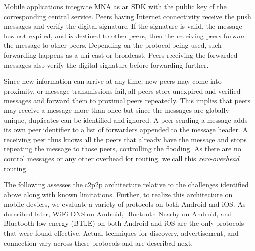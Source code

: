 \documentclass[conference]{IEEEtran}
\begin{document}
Mobile applications integrate MNA as an SDK with the public key of the
corresponding central service. Peers having Internet connectivity
receive the push messages and verify the digital signature.  If the
signature is valid, the message has not expired, and is destined to
other peers, then the receiving peers forward the message to other
peers. Depending on the protocol being used, such forwarding happens
as a uni-cast or broadcast. Peers receiving the forwarded messages
also verify the digital signature before forwarding further.

Since new information can arrive at any time, new peers may come into
proximity, or message transmissions fail, all peers store unexpired
and verified messages and forward them to proximal peers
repeatedly. This implies that peers may receive a message more than
once but since the messages are globally unique, duplicates can be
identified and ignored.  A peer sending a message adds its own peer
identifier to a list of forwarders appended to the message header.  A
receiving peer thus knows all the peers that already have the message
and stops repeating the message to those peers, controlling the
flooding.  As there are no control messages or any other overhead for
routing, we call this \emph{zero-overhead} routing.

The following assesses the c2p2p architecture relative to the
challenges identified above along with known limitations. Further, to
realize this architecture on mobile devices, we evaluate a variety of
protocols on both Android and iOS. As described later, WiFi DNS on
Android, Bluetooth Nearby on Android, and Bluetooth low energy (BTLE)
on both Android and iOS are the only protocols that were found
effective. Actual techniques for discovery, advertisement, and
connection vary across these protocols and are described next.
%
\end{document}
